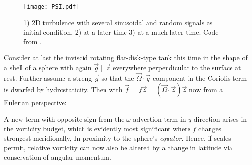 \begin{fullwidth}

\begin{figure}
\texttt{[image: PSI.pdf]}
\caption{1) 2D turbulence with several sinusoidal and random signals as initial condition, 2) at a later time 3) at a much later time. Code from
\citet{Seibold2008a}.}
\label{fig:PSI}
\end{figure}

\begin{turbu}\label{turb:beta}
Consider at last the inviscid rotating flat-disk-type tank this time in the shape of a shell of a sphere with again $\vec{g} \parallel \vec{z}$ everywhere
perpendicular to the surface at rest. Further assume a strong $\vec{g}$ so that the $\vec{\Omega} \cdot \vec{y}$ component in the Coriolis term is dwarfed by
hydrostaticity. Then with $\vec{f}=f \vec{z} = \left( \vec{\Omega} \cdot \vec{z} \right)\vec{z}$ now from a Eulerian perspective:

A new term with opposite sign from the $\omega$-advection-term in $y$-direction arises in the vorticity budget, which is evidently most significant where $f$
changes strongest meridionally, \ie In proximity to the sphere's \textit{equator}. Hence, if scales permit, relative vorticity can now also be altered by a
change in latitude via conservation of angular momentum.
\end{turbu}

\end{fullwidth}
